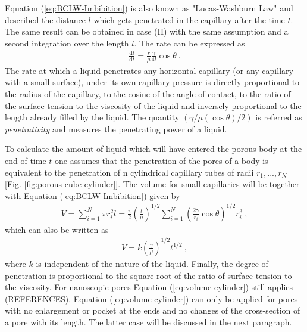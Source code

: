 \documentclass[aip, amsmath, amssymb, reprint, twocolumn, floatfix]{revtex4-1}
\newcommand{\dldt}{\frac{\mathrm{d}l}{\mathrm{d}t}}
\begin{document}
Equation (\ref{eq:BCLW-Imbibition}) is also known as "Lucas-Washburn Law" and described the distance $l$ which gets penetrated in the capillary after the time $t$. The same result can be obtained in case (II) with the same assumption and a second integration over the length $l$. The rate can be expressed as
\begin{gather}
	\boxed{\dldt = \frac{r}{\mu} \frac{\gamma}{4l} \cos \theta}~.
	\label{eq:rate}
\end{gather}
The rate at which a liquid penetrates any horizontal capillary (or any capillary with a small surface), under its own capillary pressure is directly proportional to the radius of the capillary, to the cosine of the angle of contact, to the ratio of the surface tension to the viscosity of the liquid and inversely proportional to the length already filled by the liquid. The quantity $(\gamma/\mu (\cos \theta)/2)$ is referred as \textit{penetrativity} and measures the penetrating power of a liquid. 
\bigskip

\begin{center}
	\captionsetup{type=figure}
	
	\label{fig:porous-cube-cylinder}
\end{center}

To calculate the amount of liquid which will have entered the porous body at the end of time $t$ one assumes that the penetration of the pores of a body is equivalent to the penetration of n cylindrical capillary tubes of radii ${r_1,...,r_N}$ [Fig. \ref{fig:porous-cube-cylinder}]. The volume for small capillaries will be together with Equation (\ref{eq:BCLW-Imbibition}) given by
\begin{gather}
	V = \sum_{i=1}^N \pi r_i^2 l = \frac{\pi}{2} \left(\frac{t}{\mu}\right)^{1/2} \sum_{i=1}^N \left(\frac{2 \gamma}{r_i}\cos\theta \right)^{1/2} r_i^3~,
\end{gather}
which can also be written as
\begin{gather}
	\boxed{V = k \left(\frac{\gamma}{\mu}\right)^{1/2} t^{1/2}}~, 
	\label{eq:volume-cylinder}
\end{gather}
where $k$ is independent of the nature of the liquid. Finally, the degree of penetration is proportional to the square root of the ratio of surface tension to the viscosity. For nanoscopic pores Equation (\ref{eq:volume-cylinder}) still applies (REFERENCES). Equation (\ref{eq:volume-cylinder}) can only be applied for pores with no enlargement or pocket at the ends and no changes of the cross-section of a pore with its length. The latter case will be discussed in the next paragraph.
\end{document}
